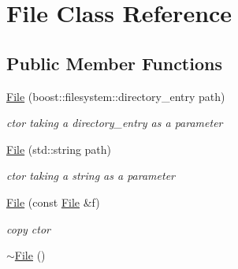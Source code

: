 \hypertarget{classFile}{}\section{File Class Reference}
\label{classFile}
\subsection*{Public Member Functions}
\begin{DoxyCompactItemize}
\item 
\hyperlink{classFile_a2aba1ffeec43f6129e2e629d394e667c}{File} (boost\+::filesystem\+::directory\+\_\+entry path)
\begin{DoxyCompactList}\small\item\em ctor taking a directory\+\_\+entry as a parameter \end{DoxyCompactList}\item 
\hyperlink{classFile_a4901fbf2e6cebd0adea4ea0cf998530f}{File} (std\+::string path)
\begin{DoxyCompactList}\small\item\em ctor taking a string as a parameter \end{DoxyCompactList}\item 
\hyperlink{classFile_a410ee9f7dbfec66da258ce51a59f2218}{File} (const \hyperlink{classFile}{File} \&f)
\begin{DoxyCompactList}\small\item\em copy ctor \end{DoxyCompactList}\item 
\hyperlink{classFile_ac704ebdf5f57d7a1c5ddf409d797fb69}{$\sim$\+File} ()\hypertarget{classFile_ac704ebdf5f57d7a1c5ddf409d797fb69}{}\label{classFile_ac704ebdf5f57d7a1c5ddf409d797fb69}


\end{DoxyCompactItemize}

